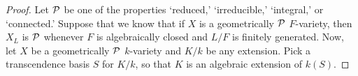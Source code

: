 \begin{proof}
	Let $\mathcal{P}$ be one of the properties `reduced,' `irreducible,' `integral,' or `connected.' Suppose that we know that if $X$ is a geometrically $\mathcal{P}$ $F$-variety, then $X_L$ is $\mathcal{P}$ whenever $F$ is algebraically closed and $L/F$ is finitely generated. Now, let $X$ be a geometrically $\mathcal{P}$ $k$-variety and $K/k$ be any extension. Pick a transcendence basis $S$ for $K/k$, so that $K$ is an algebraic extension of $k(S)$. 
\end{proof}
